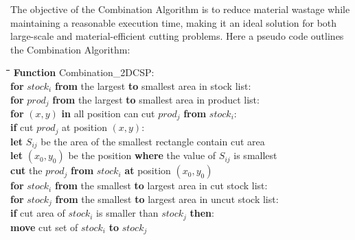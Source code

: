\documentclass[a4paper]{article}
\begin{document}
    The objective of the Combination Algorithm is to reduce material wastage while maintaining a reasonable execution time, making it an ideal solution for both large-scale and material-efficient cutting problems. Here a pseudo code outlines the Combination Algorithm:
    \label{sec:heuristic}
    \begin{mdframed}[backgroundcolor=black!10]
        \begin{tabbing}
        \hspace{0.5cm}\=\hspace{0.5cm}\=\hspace{0.5cm}\=\hspace{0.5cm}\=\hspace{0.5cm}\=\kill
            \textbf{Function} Combination\_2DCSP: \\
            \> \textbf{for} $stock_i$ \textbf{from} the largest \textbf{to} smallest area in stock list: \\
            \>\> \textbf{for} $prod_j$ \textbf{from} the largest \textbf{to} smallest area in product list: \\
            \>\>\> \textbf{for} $(x,y)$ \textbf{in} all position can cut $prod_j$ \textbf{from} $stock_i$: \\
            \>\>\>\> \textbf{if} cut $prod_j$ at position $(x,y)$:\\
            \>\>\>\>\> \textbf{let} $S_{ij}$ be the area of the smallest rectangle contain cut area \\
            \>\>\> \textbf{let} $(x_{0},y_{0})$ be the position \textbf{where} the value of $S_{ij}$ is smallest \\
            \>\>\> \textbf{cut} the $prod_j$ \textbf{from} $stock_i$ \textbf{at} position $(x_{0},y_{0})$ \\
            \> \textbf{for} $stock_i$ \textbf{from} the smallest \textbf{to} largest area in cut stock list:\\
            \>\> \textbf{for} $stock_j$ \textbf{from} the smallest \textbf{to} largest area in uncut stock list:\\
            \>\>\> \textbf{if} cut area of $stock_i$ is smaller than $stock_j$ \textbf{then}: \\
            \>\>\>\> \textbf{move} cut set of $stock_i$ \textbf{to} $stock_j$       
        \end{tabbing}
    \end{mdframed}


    
\end{document}
